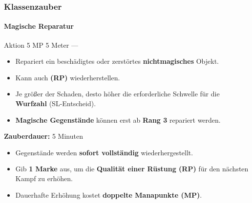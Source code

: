\subsubsection*{Klassenzauber}

\paragraph*{Magische Reparatur}
\spellcard
{}
{Aktion}
{5 MP}
{5 Meter}
{—}
{
	\begin{itemize}
		\item Repariert ein beschädigtes oder zerstörtes \textbf{nichtmagisches} Objekt.
		\item Kann auch \textbf{  (RP)} wiederherstellen.
		\item Je größer der Schaden, desto höher die erforderliche Schwelle für die \textbf{Wurfzahl} (SL-Entscheid).
		\item \textbf{Magische Gegenstände} können erst ab \textbf{Rang 3} repariert werden.
	\end{itemize}
	
	\medskip
	\textbf{Zauberdauer:} 5 Minuten
}
{
	\begin{itemize}
		\item Gegenstände werden \textbf{sofort vollständig} wiederhergestellt.
		\item Gib \textbf{1 Marke} aus, um die \textbf{Qualität einer Rüstung (RP)} für den nächsten Kampf zu erhöhen.
		\item Dauerhafte Erhöhung kostet \textbf{doppelte Manapunkte (MP)}.
	\end{itemize}
}

